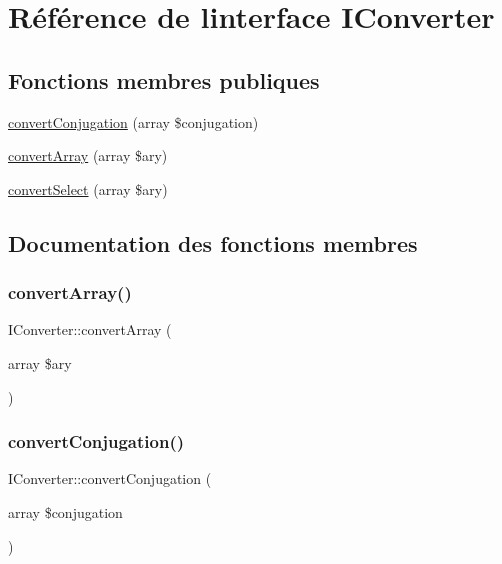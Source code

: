 \hypertarget{interface_i_converter}{}\section{Référence de l\textquotesingle{}interface I\+Converter}
\label{interface_i_converter}
\subsection*{Fonctions membres publiques}
\begin{DoxyCompactItemize}
\item 
\hyperlink{interface_i_converter_a70da506cb0dc20f14fc4e115bb100be4}{convert\+Conjugation} (array \$conjugation)
\item 
\hyperlink{interface_i_converter_a4afb4ac5fbf61f0d82dcc8393475d34a}{convert\+Array} (array \$ary)
\item 
\hyperlink{interface_i_converter_a5d0890843015f4f9bf962ed9ac67504c}{convert\+Select} (array \$ary)
\end{DoxyCompactItemize}


\subsection{Documentation des fonctions membres}
\hypertarget{interface_i_converter_a4afb4ac5fbf61f0d82dcc8393475d34a}{}\label{interface_i_converter_a4afb4ac5fbf61f0d82dcc8393475d34a} 
\subsubsection{\texorpdfstring{convert\+Array()}{convertArray()}}
{\footnotesize\ttfamily I\+Converter\+::convert\+Array (\begin{DoxyParamCaption}\item[{array}]{\$ary }\end{DoxyParamCaption})}

\hypertarget{interface_i_converter_a70da506cb0dc20f14fc4e115bb100be4}{}\label{interface_i_converter_a70da506cb0dc20f14fc4e115bb100be4} 
\subsubsection{\texorpdfstring{convert\+Conjugation()}{convertConjugation()}}
{\footnotesize\ttfamily I\+Converter\+::convert\+Conjugation (\begin{DoxyParamCaption}\item[{array}]{\$conjugation }\end{DoxyParamCaption})}

